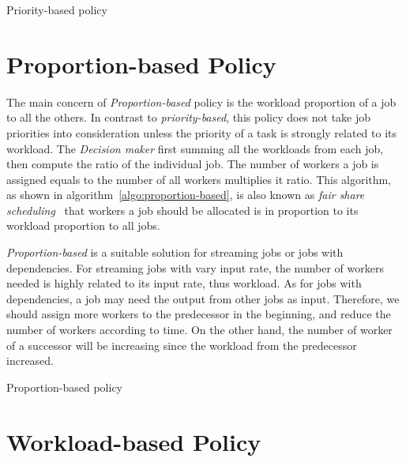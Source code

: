 \begin{algorithm}[htbp]
  
  \caption{Priority-based policy}
  \label{algo:priority-based}
\end{algorithm}

\section{Proportion-based Policy}	 %

The main concern of \emph{Proportion-based} policy is the workload
proportion of a job to all the others.
In contrast to \emph{priority-based}, this policy does not take job 
priorities into consideration unless the priority of a task is strongly 
related to its workload.
The \emph{Decision maker} first summing all the workloads from each job, 
then compute the ratio of the individual job.
The number of workers a job is assigned equals to the number of all 
workers multiplies it ratio.
This algorithm, as shown in algorithm~\ref{algo:proportion-based}, is
also known as \emph{fair share
scheduling}~\cite{ite:fair-share-scheduling} that workers a job should
be allocated is in proportion to its workload proportion to all jobs. 

\emph{Proportion-based} is a suitable solution for streaming jobs or
jobs with dependencies.
For streaming jobs with vary input rate, the number of workers needed is
highly related to its input rate, thus workload.
As for jobs with dependencies, a job may need the output from other 
jobs as input.
Therefore, we should assign more workers to the predecessor in the 
beginning, and reduce the number of workers according to time.
On the other hand, the number of worker of a successor will be 
increasing since the workload from the predecessor increased.


\begin{algorithm}[htbp]
  
  \caption{Proportion-based policy}
  \label{algo:proportion-based}
\end{algorithm}


\section{Workload-based Policy}       %

